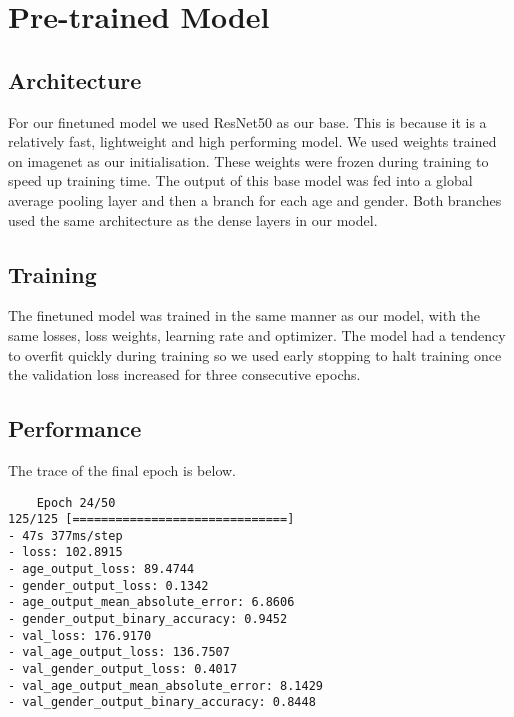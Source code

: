 
\section{Pre-trained Model}
\subsection{Architecture}
For our finetuned model we used ResNet50 as our base. This is because it is a relatively fast,
lightweight and high performing model. We used weights trained on imagenet as our initialisation.
These weights were frozen during training to speed up training time.
The output of this base model was fed into a global average pooling layer and then a branch
 for each age and gender. Both branches used the same architecture as the dense layers in our 
 model.  

 \subsection{Training}
 The finetuned model was trained in the same manner as our model, with the same losses, loss weights,
 learning rate and optimizer. The model had a tendency to overfit quickly during training
 so we used early stopping to halt training once the validation loss increased for three 
 consecutive epochs. 
 
 \subsection{Performance}
The trace of the final epoch is below.
\begin{verbatim}
    Epoch 24/50
125/125 [==============================] 
- 47s 377ms/step 
- loss: 102.8915 
- age_output_loss: 89.4744 
- gender_output_loss: 0.1342 
- age_output_mean_absolute_error: 6.8606 
- gender_output_binary_accuracy: 0.9452 
- val_loss: 176.9170 
- val_age_output_loss: 136.7507 
- val_gender_output_loss: 0.4017 
- val_age_output_mean_absolute_error: 8.1429 
- val_gender_output_binary_accuracy: 0.8448
\end{verbatim}

